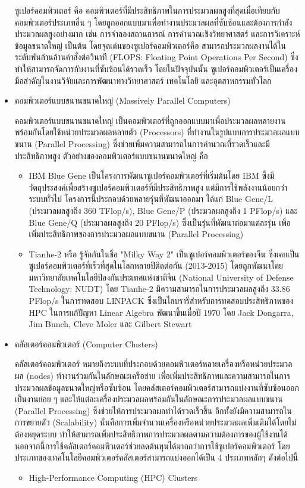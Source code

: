 \documentclass[a4paper,12pt]{extarticle}
\begin{document}
\begin{itemize}
	ซูเปอร์คอมพิวเตอร์ คือ คอมพิวเตอร์ที่มีประสิทธิภาพในการประมวลผลสูงที่สุดเมื่อเทียบกับคอมพิวเตอร์ประเภทอื่น ๆ โดยถูกออกแบบมาเพื่อทำงานประมวลผลที่ซับซ้อนและต้องการกำลังประมวลผลสูงอย่างมาก เช่น การจำลองสถานการณ์ การคำนวณเชิงวิทยาศาสตร์ และการวิเคราะห์ข้อมูลขนาดใหญ่ เป็นต้น โดยจุดเด่นของซูเปอร์คอมพิวเตอร์คือ สามารถประมวลผลงานได้ในระดับพันล้านล้านคำสั่งต่อวินาที (FLOPS: Floating Point Operations Per Second) ซึ่งทำให้สามารถจัดการกับงานที่ซับซ้อนได้รวดเร็ว โดยในปัจจุบันนั้น ซูเปอร์คอมพิวเตอร์เป็นเครื่องมือสำคัญในงานวิจัยและการพัฒนาทางวิทยาศาสตร์ เทคโนโลยี และอุตสาหกรรมทั่วโลก
	\item คอมพิวเตอร์แบบขนานขนาดใหญ่ (Massively Parallel Computers)

	คอมพิวเตอร์แบบขนานขนาดใหญ่ เป็นคอมพิวเตอร์ที่ถูกออกแบบมาเพื่อประมวลผลหลายงานพร้อมกันโดยใช้หน่วยประมวลผลหลายตัว (Processors) ที่ทำงานในรูปแบบการประมวลผลแบบขนาน (Parallel Processing) ซึ่งช่วยเพิ่มความสามารถในการคำนวณที่รวดเร็วและมีประสิทธิภาพสูง ตัวอย่างของคอมพิวเตอร์แบบขนานขนาดใหญ่ คือ
	\begin{itemize}
		\item IBM Blue Gene เป็นโครงการพัฒนาซูเปอร์คอมพิวเตอร์ที่เริ่มต้นโดย IBM ซึ่งมีวัตถุประสงค์เพื่อสร้างซูเปอร์คอมพิวเตอร์ที่มีประสิทธิภาพสูง แต่มีการใช้พลังงานน้อยกว่าระบบทั่วไป โครงการนี้ประกอบด้วยหลายรุ่นที่พัฒนาออกมา ได้แก่ Blue Gene/L (ประมวลผลสูงถึง 360 TFlop/s), Blue Gene/P (ประมวลผลสูงถึง 1 PFlop/s) และ Blue Gene/Q (ประมวลผลสูงถึง 20 PFlop/s) ซึ่งเป็นรุ่นที่พัฒนาต่อมาแต่ละรุ่น เพื่อเพิ่มประสิทธิภาพของการประมวลผลแบบขนาน (Parallel Processing)

		\item Tianhe-2 หรือ รู้จักกันในชื่อ "Milky Way 2" เป็นซูเปอร์คอมพิวเตอร์ของจีน ซึ่งเคยเป็นซูเปอร์คอมพิวเตอร์ที่เร็วที่สุดในโลกหลายปีติดต่อกัน (2013-2015) โดยถูกพัฒนาโดยมหาวิทยาลัยเทคโนโลยีป้องกันประเทศแห่งชาติจีน (National University of Defense Technology: NUDT) โดย Tianhe-2 มีความสามารถในการประมวลผลสูงถึง 33.86 PFlop/s ในการทดสอบ LINPACK ซึ่งเป็นไลบรารี่สำหรับการทดสอบประสิทธิภาพของ HPC ในการแก้ปัญหา Linear Algebra พัฒนาขึ้นเมื่อปี 1970 โดย Jack Dongarra, Jim Bunch, Cleve Moler และ Gilbert Stewart
	\end{itemize}
	\item คลัสเตอร์คอมพิวเตอร์ (Computer Clusters)

	คลัสเตอร์คอมพิวเตอร์ หมายถึงระบบที่ประกอบด้วยคอมพิวเตอร์หลายเครื่องหรือหน่วยประมวลผล (nodes) ทำงานร่วมกันในลักษณะเครือข่าย เพื่อเพิ่มประสิทธิภาพและความสามารถในการประมวลผลข้อมูลขนาดใหญ่หรือซับซ้อน โดยคลัสเตอร์คอมพิวเตอร์สามารถแบ่งงานที่ซับซ้อนออกเป็นงานย่อย ๆ และให้แต่ละเครื่องประมวลผลพร้อมกันในลักษณะการประมวลผลแบบขนาน (Parallel Processing) ซึ่งช่วยให้การประมวลผลทำได้รวดเร็วขึ้น อีกทั้งยังมีความสามารถในการขยายตัว (Scalability) นั่นคือการเพิ่มจำนวนเครื่องหรือหน่วยประมวลผลเพิ่มเติมได้โดยไม่ต้องหยุดระบบ ทำให้สามารถเพิ่มประสิทธิภาพการประมวลผลตามความต้องการของผู้ใช้งานได้ นอกจากนี้การใช้คลัสเตอร์คอมพิวเตอร์ช่วยลดต้นทุนได้มากกว่าการใช้ซูเปอร์คอมพิวเตอร์ โดยประเภทของเทคโนโลยีคอมพิวเตอร์คลัสเตอร์สามารถแบ่งออกได้เป็น 4 ประเภทหลักๆ ดังต่อไปนี้
	\begin{itemize}
		\item High-Performance Computing (HPC) Clusters


\end{itemize}
\end{itemize}
\end{document}
